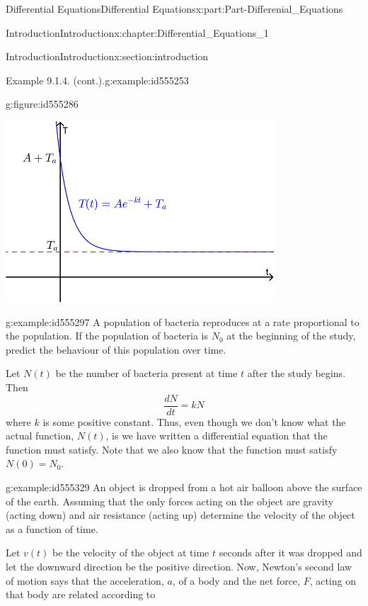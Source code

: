 \documentclass[oneside,10pt,]{book}
\numberwithin{equation}{section}
\begin{document}
\begin{partptx}{Differential Equations}{}{Differential Equations}{}{}{x:part:Part-Differenial_Equations}
\begin{chapterptx}{Introduction}{}{Introduction}{}{}{x:chapter:Differential_Equations_1}
\begin{sectionptx}{Introduction}{}{Introduction}{}{}{x:section:introduction}
\begin{example}{Example 9.1.4. (cont.).}{g:example:id555253}
\begin{figureptx}{}{g:figure:id555286}{}
\begin{image}{0.125}{0.75}{0.125}%
\includegraphics[width=\linewidth]{./DifferentialEquations/Images/1/1_example3.png}
\end{image}%
\tcblower
\end{figureptx}%
%
\end{example}
\begin{example}{}{g:example:id555297}%
A population of bacteria reproduces at a rate proportional to the population. If the population of bacteria is \(N_0\) at the beginning of the study, predict the behaviour of this population over time.%
\par\smallskip%
\noindent\hypertarget{g:solution:id555342}{}Let \(N(t)\) be the number of bacteria present at time \(t\) after the study begins. Then%
\begin{equation*}
\frac{dN}{dt}=kN 
\end{equation*}
where \(k\) is some positive constant. Thus, even though we don’t know what the actual function, \(N(t)\), is we have written a differential equation that the function must satisfy. Note that we also know that the function must satisfy \(N(0)=N_0\).%
\end{example}
\begin{example}{}{g:example:id555329}%
An object is dropped from a hot air balloon above the surface of the earth. Assuming that the only forces acting on the object are gravity (acting down) and air resistance (acting up) determine the velocity of the object as a function of time.%
\par\smallskip%
\noindent\hypertarget{g:solution:id555340}{}Let \(v(t)\) be the velocity of the object at time \(t\) seconds after it was dropped and let the downward direction be the positive direction. Now, Newton’s second law of motion says that the acceleration, \(a\), of a body and the net force, \(F\), acting on that body are related according to%

\end{example}
\end{sectionptx}
\end{chapterptx}
\end{partptx}
\end{document}
